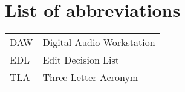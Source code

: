 \chapter*{List of abbreviations}

\begin{tabular}{l l}
DAW & Digital Audio Workstation \\
EDL & Edit Decision List \\
TLA & Three Letter Acronym
\end{tabular}
